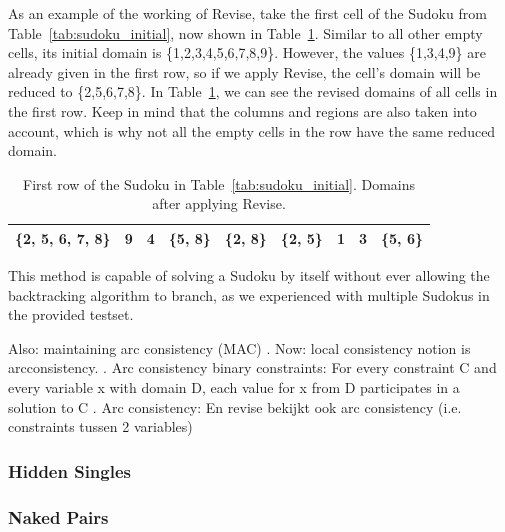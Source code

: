 \documentclass[11pt]{article} %
\begin{document}
As an example of the working of Revise, take the first cell of the Sudoku from Table~\ref{tab:sudoku_initial}, now shown in Table~\ref{tab:sudoku_frstrow_rev}. Similar to all other empty cells, its initial domain is \{1,2,3,4,5,6,7,8,9\}.
However, the values \{1,3,4,9\} are already given in the first row, so if we apply Revise, the cell's domain will be reduced to \{2,5,6,7,8\}.
In Table~\ref{tab:sudoku_frstrow_rev}, we can see the revised domains of all cells in the first row. Keep in mind that the columns and regions are also taken into account, which is why not all the empty cells in the row have the same reduced domain.

\begin{table}[htbp]
\caption{First row of the Sudoku in Table~\ref{tab:sudoku_initial}. Domains after applying Revise.}
    \label{tab:sudoku_frstrow_rev}

    \begin{center}
        \begin{tabular}{||c|c|c||c|c|c||c|c|c||}
        \hline
        \hline
        \{2, 5, 6, 7, 8\} & 9 & 4 & \{5, 8\} & \{2, 8\} & \{2, 5\} & 1 & 3 & \{5, 6\}\\
        \hline
        \end{tabular}
    \end{center}
\end{table}


This method is capable of solving a Sudoku by itself without ever allowing the backtracking algorithm to branch, as we experienced with multiple Sudokus in the provided testset.

Also:
maintaining arc consistency (MAC)
. Now: local consistency notion is arcconsistency.
. Arc consistency binary constraints:
For every constraint C and every variable x with domain D, each
value for x from D participates in a solution to C
. Arc consistency:
En revise bekijkt ook arc consistency (i.e. constraints tussen 2 variables)

\subsubsection{Hidden Singles}



\subsubsection{Naked Pairs}
\end{document}
